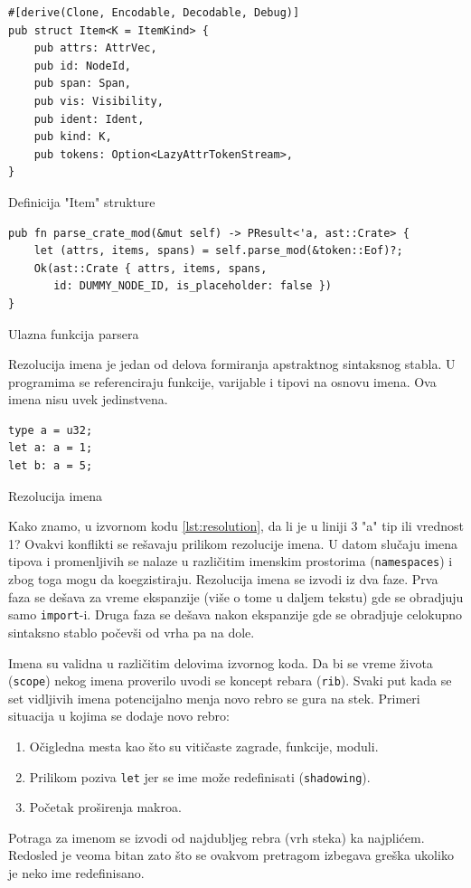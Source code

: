 \documentclass[11pt]{article}
\begin{document}
\begin{listing}[H]
\begin{verbatim}
#[derive(Clone, Encodable, Decodable, Debug)]
pub struct Item<K = ItemKind> {
    pub attrs: AttrVec,
    pub id: NodeId,
    pub span: Span,
    pub vis: Visibility,
    pub ident: Ident,
    pub kind: K,
    pub tokens: Option<LazyAttrTokenStream>,
}
\end{verbatim}
\caption{Definicija "Item" strukture}
\end{listing}

\begin{listing}[H]
\begin{verbatim}
pub fn parse_crate_mod(&mut self) -> PResult<'a, ast::Crate> {
    let (attrs, items, spans) = self.parse_mod(&token::Eof)?;
    Ok(ast::Crate { attrs, items, spans, 
       id: DUMMY_NODE_ID, is_placeholder: false })
}
\end{verbatim}
\caption{Ulazna funkcija parsera}
\end{listing}


Rezolucija imena je jedan od delova formiranja apstraktnog sintaksnog stabla.
U programima se referenciraju funkcije, varijable i tipovi na osnovu imena. Ova imena nisu uvek jedinstvena.

\begin{listing}[H]
\begin{verbatim}
type a = u32;
let a: a = 1;
let b: a = 5; 
\end{verbatim}
\caption{Rezolucija imena}
\label{lst:resolution}
\end{listing}

Kako znamo, u izvornom kodu \ref{lst:resolution}, da li je u liniji 3 "a" tip ili vrednost 1?
Ovakvi konflikti se rešavaju prilikom rezolucije imena. U datom slučaju imena tipova i promenljivih se nalaze 
u različitim imenskim prostorima (\verb|namespaces|) i zbog toga mogu da koegzistiraju.
Rezolucija imena se izvodi iz dva faze. Prva faza se dešava za vreme ekspanzije (više o tome u daljem tekstu) 
gde se obradjuju samo \verb|import|-i. Druga faza se dešava nakon ekspanzije gde se obradjuje celokupno 
sintaksno stablo počevši od vrha pa na dole. 

Imena su validna u različitim delovima izvornog koda. Da bi se 
vreme života (\verb|scope|) nekog imena proverilo uvodi se koncept rebara (\verb|rib|). Svaki put kada se 
set vidljivih imena potencijalno menja novo rebro se gura na stek. Primeri situacija u kojima se dodaje 
novo rebro:
\begin{enumerate}
    \item Očigledna mesta kao što su vitičaste zagrade, funkcije, moduli.
    \item Prilikom poziva \verb|let| jer se ime može redefinisati (\verb|shadowing|).
    \item Početak proširenja makroa. 
\end{enumerate}
Potraga za imenom se izvodi od najdubljeg rebra (vrh steka) ka najplićem. 
Redosled je veoma bitan zato što se ovakvom pretragom izbegava greška 
ukoliko je neko ime redefinisano.
\end{document}
